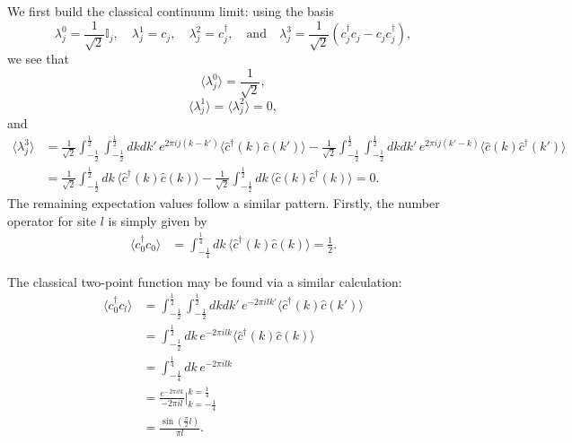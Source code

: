\documentclass[prl,twocolumn,lengthcheck,superscriptaddress]{revtex4-1}
\theoremstyle{definition}
\theoremstyle{remark}
\begin{document}
We first build the classical continuum limit: using the basis 
\begin{equation}
	\lambda^0_j = \frac{1}{\sqrt{2}}\mathbb{I}_j, \quad \lambda^{1}_j = c_j, \quad \lambda^{2}_j = c_j^\dag, \quad\text{and}\quad \lambda^{3}_j = \frac{1}{\sqrt{2}}(c_j^\dag c_j - c_j c_j^\dag),
\end{equation}
we see that 
\begin{equation}
	\langle \lambda_j^0\rangle = \frac{1}{\sqrt2},
\end{equation}
\begin{equation}
	\langle \lambda_j^1\rangle = \langle \lambda_j^2\rangle = 0,
\end{equation}
and
\begin{equation}
	\begin{split}
		\langle \lambda_j^3\rangle &= \frac{1}{\sqrt2}\int_{-\frac12}^{\frac12}\int_{-\frac12}^{\frac12} dkdk'\, e^{2\pi ij (k-k')} \langle \widehat{c}^\dag(k)\widehat{c}(k')\rangle - \frac{1}{\sqrt2}\int_{-\frac12}^{\frac12}\int_{-\frac12}^{\frac12} dkdk'\, e^{2\pi ij (k'-k)} \langle \widehat{c}(k)\widehat{c}^\dag(k')\rangle \\
		&= \frac{1}{\sqrt2}\int_{-\frac12}^{\frac12} dk\,  \langle \widehat{c}^\dag(k)\widehat{c}(k)\rangle - \frac{1}{\sqrt2}\int_{-\frac12}^{\frac12} dk\, \langle \widehat{c}(k)\widehat{c}^\dag(k)\rangle = 0.
	\end{split}
\end{equation}
The remaining expectation values follow a similar pattern. Firstly, the number operator for site $l$ is simply given by
\begin{equation}
	\begin{split}
		\langle c_0^\dag c_0\rangle &= \int_{-\frac14}^{\frac14} dk\,  \langle \widehat{c}^\dag(k)\widehat{c}(k)\rangle = \frac12.
	\end{split}
\end{equation}

 The classical two-point function may be found via a similar calculation: 
\begin{equation}
	\begin{split}
		\langle c_0^\dag c_l\rangle &= \int_{-\frac12}^{\frac12}\int_{-\frac12}^{\frac12} dkdk'\, e^{-2\pi ilk'} \langle \widehat{c}^\dag(k)\widehat{c}(k')\rangle \\
		&= \int_{-\frac12}^{\frac12} dk\, e^{-2\pi ilk} \langle \widehat{c}^\dag(k)\widehat{c}(k)\rangle \\
		&= \int_{-\frac14}^{\frac14} dk\, e^{-2\pi ilk}\\ 
		&= \frac{e^{-2\pi ilk}}{-2\pi i l}\bigg|_{k=-\frac14}^{k=\frac14} \\
		&= \frac{\sin(\frac{\pi }{2}l)}{\pi  l}.
	\end{split}
\end{equation}
\end{document}
